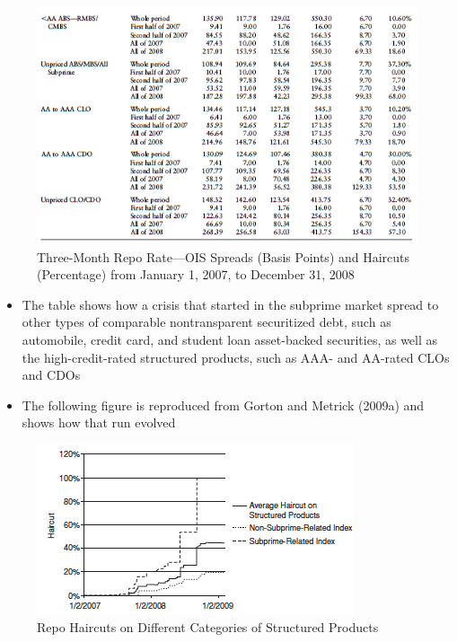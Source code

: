 \documentclass[11pt]{beamer}
\begin{document}
\begin{frame}
\begin{figure}
\includegraphics[width=\textwidth]{11_11.png}
\caption{Three-Month Repo Rate—OIS Spreads (Basis Points) and Haircuts (Percentage) from January 1, 2007, to December 31, 2008}
\end{figure}
\end{frame}

\begin{frame}
\begin{itemize}
\item The table shows how a crisis that started in the subprime market spread to other types of comparable nontransparent securitized debt, such as automobile, credit card, and student loan asset-backed securities, as well as the high-credit-rated structured products, such as AAA- and AA-rated CLOs and CDOs
\item The following figure is reproduced from Gorton and Metrick (2009a) and shows how that run evolved
\end{itemize}
\end{frame}

\begin{frame}
\begin{figure}
\includegraphics[width=\textwidth]{11_12.png}
\caption{Repo Haircuts on Different Categories of Structured Products}
\end{figure}
\end{frame}
\end{document}
